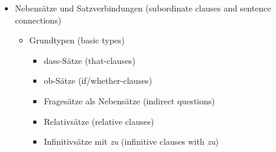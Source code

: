 \documentclass[a4paper]{article}
\begin{document}
\begin{itemize}
\begin{itemize}
                \item Negation {\small (negation)}
                \begin{itemize}
                    \item \textit{nicht} {\small (not)}
                    \item \textit{kein} {\small (no / none)}
                    \item pauschale Negation {\small (general negation)}
                    \item Negationswörter {\small (negative words)}
                \end{itemize}
            \end{itemize}
            
            \item Nebensätze und Satzverbindungen {\small (subordinate clauses and sentence connections)}
            \begin{itemize}
                \item Grundtypen {\small (basic types)}
                \begin{itemize}
                    \item dass-Sätze {\small (that-clauses)}
                    \item ob-Sätze {\small (if/whether-clauses)}
                    \item Fragesätze als Nebensätze {\small (indirect questions)}
                    \item Relativsätze {\small (relative clauses)}
                    \item Infinitivsätze mit \textit{zu} {\small (infinitive clauses with \textit{zu})}
                \end{itemize}
                

\end{itemize}
\end{itemize}
\end{document}
